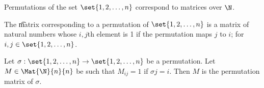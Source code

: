 
\sbasic































\sstart
{}


Permutations of the set $\set{1, 2, \dots, n}$ correspond to matrices over $\N$.


The \t{matrix} corresponding to a permutation of $\set{1, 2, \dots, n}$ is a matrix of natural numbers whose $i,j$th element is 1 if the permutation maps $j$ to $i$; for $i, j \in \set{1, 2, \dots, n}$.


Let $\sigma: \set{1, 2, \dots, n} \to \set{1, 2, \dots, n}$ be a permutation.
Let $M \in \Mat{\N}{n}{n}$ be such that $M_{ij} = 1$ if $\sigma{j} = i$.
Then $M$ is the permutation matrix of $\sigma$.
\strats
